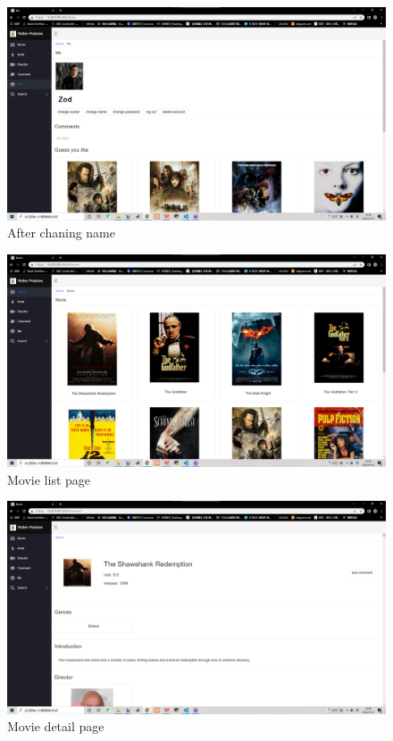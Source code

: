 \begin{CJK*}{UTF8}{gbsn}
    \begin{figure}[htbp]
    \centering
    \includegraphics[width=1\textwidth]{res_name2.png}
    \caption{After chaning name}
    \end{figure}
    
    \begin{figure}[htbp]
    \centering
    \includegraphics[width=1\textwidth]{res_movie1.png}
    \caption{Movie list page}
    \end{figure}
    
    \begin{figure}[htbp]
    \centering
    \includegraphics[width=1\textwidth]{res_movie2.png}
    \caption{Movie detail page}
    \end{figure}
    

\end{CJK*}
